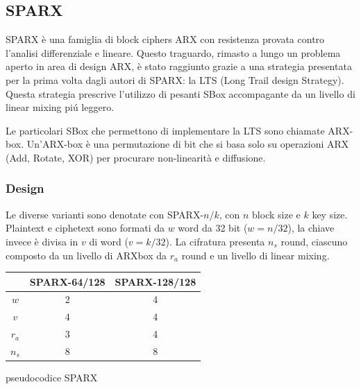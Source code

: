 \documentclass[target=bach,aauheader=,style=]{thud}
\begin{document}
		\subsection{SPARX}
		SPARX è una famiglia di block ciphers ARX con resistenza provata contro l'analisi differenziale e lineare. Questo traguardo, rimasto a lungo un problema aperto in area di design ARX, è stato raggiunto grazie a una strategia presentata per la prima volta dagli autori di SPARX: la LTS\cite{sparx} (Long Trail design Strategy). Questa strategia prescrive l'utilizzo di pesanti SBox accompagante da un livello di linear mixing piú leggero.
		
		Le particolari SBox che permettono di implementare la LTS sono chiamate ARX-box. Un'ARX-box è una permutazione di bit che si basa solo su operazioni ARX (Add, Rotate, XOR) per procurare non-linearità e diffusione.
			\subsubsection{Design}
			Le diverse varianti sono denotate con SPARX-$n/k$, con $n$ block size e $k$ key size.\\
			Plaintext e ciphetext sono formati da $w$ word da 32 bit ($w = n/32$), la chiave invece è divisa in $v$ di word ($v = k/32$). La cifratura presenta $n_s$ round, ciascuno composto da un livello di ARXbox da $r_a$ round e un livello di linear mixing.\\
			\begin{center}
				\begin{tabular}{ |c|c|c| } 
					\hline
					& \textbf{SPARX-64/128} & \textbf{SPARX-128/128} \\ 
					\hline 
					\hline
					$w$ & 2 & 4\\
					\hline
					$v$ & 4 & 4\\
					\hline
					$r_a$ & 3 & 4\\
					\hline
					$n_s$ & 8 & 8\\
					\hline
				\end{tabular}
			\end{center}
			\begin{algorithm}
				\caption{pseudocodice SPARX}
				\begin{algorithmic}
					\EndFor
					\EndFor
					\EndFor
					\EndProcedure
				\end{algorithmic}
			\end{algorithm}
			
\end{document}
